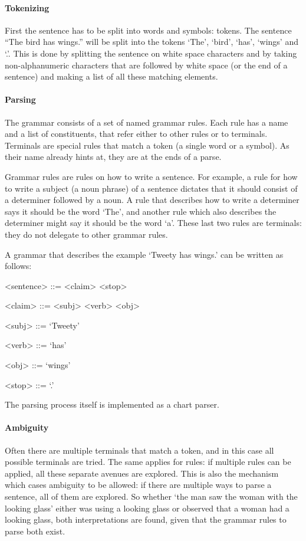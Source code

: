 \paragraph{Tokenizing} First the sentence has to be split into words and symbols: tokens. The sentence ``The bird has wings.'' will be split into the tokens `The', `bird', `has', `wings' and `.'. This is done by splitting the sentence on white space characters and by taking non-alphanumeric characters that are followed by white space (or the end of a sentence) and making a list of all these matching elements.

\paragraph{Parsing} The grammar consists of a set of named grammar rules. Each rule has a name and a list of constituents, that refer either to other rules or to terminals. Terminals are special rules that match a token (a single word or a symbol). As their name already hints at, they are at the ends of a parse.

Grammar rules are rules on how to write a sentence. For example, a rule for how to write a subject (a noun phrase) of a sentence dictates that it should consist of a determiner followed by a noun. A rule that describes how to write a determiner says it should be the word `The', and another rule which also describes the determiner might say it should be the word `a'. These last two rules are terminals: they do not delegate to other grammar rules.

A grammar that describes the example `Tweety has wings.' can be written as follows:

\begin{grammar}
<sentence> ::= <claim> <stop>

<claim> ::= <subj> <verb> <obj>

<subj> ::= `Tweety'

<verb> ::= `has'

<obj> ::= `wings'

<stop> ::= `.'
\end{grammar}

The parsing process itself is implemented as a chart parser.

\paragraph{Ambiguity} Often there are multiple terminals that match a token, and in this case all possible terminals are tried. The same applies for rules: if multiple rules can be applied, all these separate avenues are explored. This is also the mechanism which cases ambiguity to be allowed: if there are multiple ways to parse a sentence, all of them are explored. So whether `the man saw the woman with the looking glass' either was using a looking glass or observed that a woman had a looking glass, both interpretations are found, given that the grammar rules to parse both exist.


